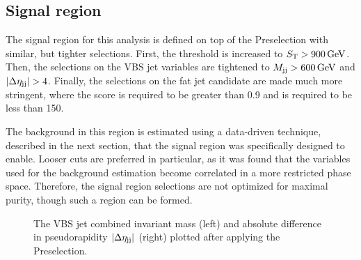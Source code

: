 \subsection{Signal region}
The signal region for this analysis is defined on top of the Preselection with similar, but tighter selections. 
First, the \ST threshold is increased to $S_{\mathrm{T}} > 900\,\text{Ge\hspace{-.08em}V}$. 
Then, the selections on the VBS jet variables are tightened to $M_{\mathrm{j}\mathrm{j}} > 600 \,\text{Ge\hspace{-.08em}V}$ and $|\Delta\eta_{\mathrm{j}\mathrm{j}}| > 4$. 
Finally, the selections on the \Htobb fat jet candidate are made much more stringent, where the \ParticleNet \Xtobb score is required to be greater than 0.9 and \MSD is required to be less than 150\GeV. 

The background in this region is estimated using a data-driven technique, described in the next section, that the signal region was specifically designed to enable. 
Looser cuts are preferred in particular, as it was found that the variables used for the background estimation become correlated in a more restricted phase space. 
Therefore, the signal region selections are not optimized for maximal purity, though such a region can be formed. 

\begin{figure}[htb]
    \centering
    \qquad
    \caption[The \Mjj and \detajj distributions for the VBS jets]{
        The VBS jet combined invariant mass \Mjj (left) and absolute difference in pseudorapidity $\lvert \Delta\eta_{\mathrm{j}\mathrm{j}} \rvert$ (right) plotted after applying the Preselection.
    }
    \label{fig:vbswh_presel_vbs}
\end{figure}

